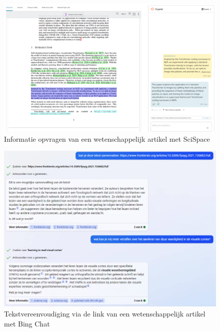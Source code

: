 \chapter{}%
\label{ch:requirementsanalyse-schermafbeeldingen}

\begin{figure}[H]
	\includegraphics{img/typeset-example.png}
	\caption{Informatie opvragen van een wetenschappelijk artikel met SciSpace}
	\label{img:scispace-example}
\end{figure}

\begin{figure}[H]
	\includegraphics{img/bing-ai-chatbot-example.png}
	\caption{Tekstvereenvoudiging via de link van een wetenschappelijk artikel met Bing Chat}
	\label{img:tryout-bing-ai}
\end{figure}

